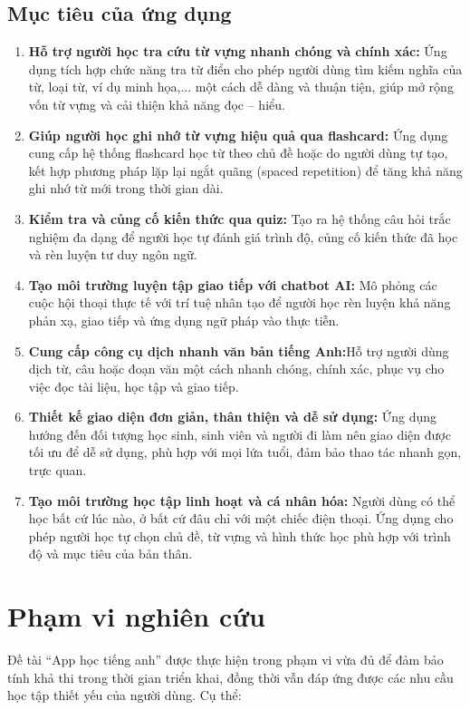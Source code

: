 \subsection{Mục tiêu của ứng dụng}
\begin{enumerate}
    \item \textbf{Hỗ trợ người học tra cứu từ vựng nhanh chóng và chính xác:} Ứng dụng tích hợp chức năng tra từ điển cho phép người dùng tìm kiếm nghĩa của từ, loại từ, ví dụ minh họa,... một cách dễ dàng và thuận tiện, giúp mở rộng vốn từ vựng và cải thiện khả năng đọc – hiểu.
    
    \item \textbf{Giúp người học ghi nhớ từ vựng hiệu quả qua flashcard:} Ứng dụng cung cấp hệ thống flashcard học từ theo chủ đề hoặc do người dùng tự tạo, kết hợp phương pháp lặp lại ngắt quãng (spaced repetition) để tăng khả năng ghi nhớ từ mới trong thời gian dài.

    \item \textbf{Kiểm tra và củng cố kiến thức qua quiz: } Tạo ra hệ thống câu hỏi trắc nghiệm đa dạng để người học tự đánh giá trình độ, củng cố kiến thức đã học và rèn luyện tư duy ngôn ngữ.

    \item \textbf{Tạo môi trường luyện tập giao tiếp với chatbot AI: }Mô phỏng các cuộc hội thoại thực tế với trí tuệ nhân tạo để người học rèn luyện khả năng phản xạ, giao tiếp và ứng dụng ngữ pháp vào thực tiễn.

    \item \textbf{Cung cấp công cụ dịch nhanh văn bản tiếng Anh:}Hỗ trợ người dùng dịch từ, câu hoặc đoạn văn một cách nhanh chóng, chính xác, phục vụ cho việc đọc tài liệu, học tập và giao tiếp.
    
    \item \textbf{Thiết kế giao diện đơn giản, thân thiện và dễ sử dụng:} Ứng dụng hướng đến đối tượng học sinh, sinh viên và người đi làm nên giao diện được tối ưu để dễ sử dụng, phù hợp với mọi lứa tuổi, đảm bảo thao tác nhanh gọn, trực quan.
    
    \item \textbf{Tạo môi trường học tập linh hoạt và cá nhân hóa:} Người dùng có thể học bất cứ lúc nào, ở bất cứ đâu chỉ với một chiếc điện thoại. Ứng dụng cho phép người học tự chọn chủ đề, từ vựng và hình thức học phù hợp với trình độ và mục tiêu của bản thân.
    
\end{enumerate}
\section{Phạm vi nghiên cứu}
Đề tài “App học tiếng anh” được thực hiện trong phạm vi vừa đủ để đảm bảo tính khả thi trong thời gian triển khai, đồng thời vẫn đáp ứng được các nhu cầu học tập thiết yếu của người dùng. Cụ thể:

